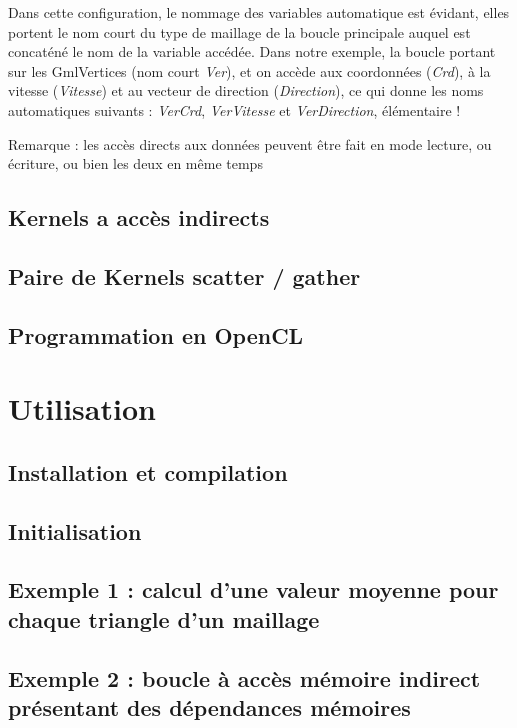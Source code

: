 \documentclass[a4paper,12pt]{article}
\begin{document}
Dans cette configuration, le nommage des variables automatique est évidant, elles portent le nom court du type de maillage de la boucle principale auquel est concaténé le nom de la variable accédée. Dans notre exemple, la boucle portant sur les GmlVertices (nom court \emph{Ver}), et on accède aux coordonnées (\emph{Crd}), à la vitesse (\emph{Vitesse}) et au vecteur de direction (\emph{Direction}), ce qui donne les noms automatiques suivants : \emph{VerCrd}, \emph{VerVitesse} et \emph{VerDirection}, élémentaire !

Remarque : les accès directs aux données peuvent être fait en mode lecture, ou écriture, ou bien les deux en même temps

\subsection{Kernels a accès indirects}

\subsection{Paire de Kernels scatter / gather}

\subsection{Programmation en OpenCL}


%
%

\section{Utilisation}

\subsection{Installation et compilation}

\subsection{Initialisation}

\subsection{Exemple 1 : calcul d'une valeur moyenne pour chaque triangle d'un maillage}

\subsection{Exemple 2 : boucle à accès mémoire indirect présentant des dépendances mémoires}
\end{document}

